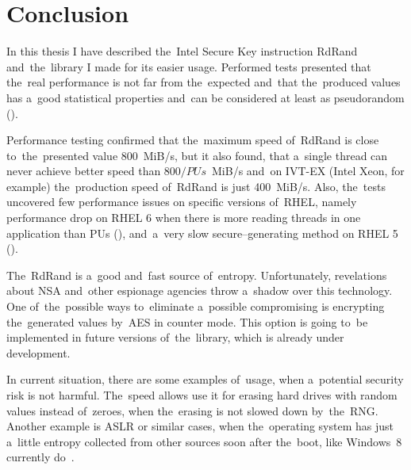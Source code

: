 \chapter{Conclusion}
\par{
In this thesis I have described the~Intel Secure Key instruction RdRand and~the~library I made for its easier usage. Performed tests presented that the~real performance is not far from the~expected and~that the~produced values has a~good statistical properties and~can be considered at least as pseudorandom ().
}

\par{
Performance testing confirmed that the~maximum speed of~RdRand is close to~the~presented value 800~MiB/s, but it also found, that a~single thread can never achieve better speed than
$800 / PUs$~MiB/s and~on IVT-EX (Intel Xeon, for example) the~production speed of~RdRand is just 400~MiB/s. Also, the~tests uncovered few performance issues on specific versions of~RHEL, namely performance drop on RHEL 6 when there is more reading threads in one application than PUs (), and~a~very slow secure--generating method on RHEL 5 ().
}

\par{
The~RdRand is a~good and~fast source of~entropy. Unfortunately, revelations about NSA and~other espionage agencies throw a~shadow over this technology. One of~the~possible ways to~eliminate a~possible compromising is encrypting the~generated values by~AES in counter mode. This option is going to~be implemented in future versions of~the~library, which is already under development.
}

\par{
In current situation, there are some examples of~usage, when a~potential security risk is not harmful. The~speed allows use it for erasing hard drives with random values instead of~zeroes, when the~erasing is not slowed down by~the~RNG. Another example is ASLR or similar cases, when the~operating system has just a~little entropy collected from other sources soon after the~boot, like Windows~8 currently do~\cite{WindowsASLR}.
}

